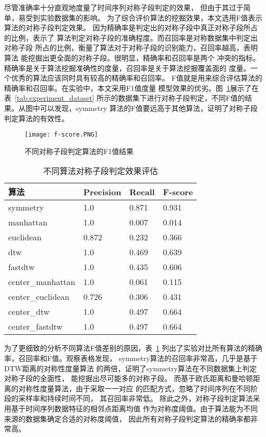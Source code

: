 尽管准确率十分直观地度量了时间序列对称子段判定的效果，
但由于其过于简单，易受到实验数据集的影响。
为了综合评价算法的挖掘效果，本文选用F值表示算法的对称子段判定效果。
因为精确率是判定出的对称子段中真正对称子段所占的比例，表示了
算法判定对称子段的准确程度。而召回率是对称数据集中判定出对称子段
所占的比例，衡量了算法对于对称子段的识别能力，召回率越高，表明算法
能挖掘出更全面的对称子段。很明显，精确率和召回率是两个
冲突的指标。精确率是关于算法挖掘准确性的度量，召回率是关于算法挖掘覆盖面的
度量。一个优秀的算法应该同时具有较高的精确率和召回率。
F值就是用来综合评估算法的精确率和召回率。在实验中，本文采用F1值度量
模型效果的优劣。图~\ref{fig:fscore_compare}展示了在表~\ref{tab:experiment_dataset}
所示的数据集下进行对称子段判定，不同F值的结果。从图中可以发现，symmetry
算法的F值要远高于其他算法，证明了对称子段判定算法的有效性。

\begin{figure}[t]
  \centering
  \texttt{[image: f-score.PNG]}
  \caption{不同对称子段判定算法的F1值结果}
  \label{fig:fscore_compare}
\end{figure}

\begin{table}
  \centering
  \caption{不同算法对称子段判定效果评估}
  \begin{tabular}{llll}
    \toprule
    算法              & Precision & Recall & F-score \\
    \midrule
    symmetry          & 1.0       & 0.871  & 0.931   \\
    manhattan         & 1.0       & 0.007  & 0.014   \\
    euclidean         & 0.872       & 0.232  & 0.366   \\
    dtw               & 1.0       & 0.469  & 0.639   \\
    fastdtw           & 1.0       & 0.435  & 0.606   \\
    center\_manhattan & 1.0       & 0.061  & 0.115   \\
    center\_euclidean & 0.726       & 0.306  & 0.431   \\
    center\_dtw       & 1.0       & 0.497  & 0.664   \\
    center\_fastdtw   & 1.0       & 0.497  & 0.664   \\
    \bottomrule
  \end{tabular}
  \label{tab:experiment_global_algo}
\end{table}

为了更细致的分析不同算法F值差别的原因，表~\ref{tab:experiment_global_algo}
列出了实验对比所有算法的精确率，召回率和F值。观察表格发现，
symmetry算法的召回率非常高，几乎是基于DTW距离的对称性度量算法
的两倍，证明了symmetry算法在不同数据集上判定对称子段的全面性，
能挖掘出尽可能多的对称子段。
而基于欧氏距离和曼哈顿距离的对称性度量算法，由于采取一一对应
的匹配方式，忽略了时间序列在不同阶段的采样率和持续时间不同，
其召回率非常低。
除此之外，对称子段判定算法采用基于时间序列数据特征的相邻点距离均值
作为对称度阈值。由于算法能为不同来源的数据集确定合适的对称度阈值，
因此所有对称子段判定算法的精确率都非常高。

